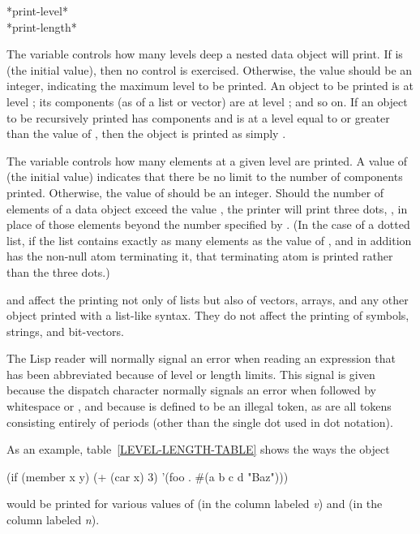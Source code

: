 \begin{defun}[Variable]
*print-level* \\
*print-length*

The  variable controls how many levels deep a nested
data object will print.
If  is {\false} (the initial value), then no control is exercised.
Otherwise, the value should be an integer, indicating the maximum level to
be printed.  An object to be printed is at level ;
its components (as of a list or vector) are at level ; and so on.
If an object to be recursively printed has components and is at a level
equal to or greater than the value of , then the object
is printed as simply \cd{\#}.

The  variable controls how many elements at a given level
are printed.  A value of {\false} (the initial value) indicates that there
be no limit to the number of components printed.  Otherwise, the value of
 should be an integer.  Should the number of elements of a
data object exceed the value , the printer will print three
dots, , in place of those elements beyond the number specified
by .  (In the case of a dotted list, if the list contains
exactly as many elements as the value of , and in addition
has the non-null atom terminating it, that terminating atom is printed
rather than the three dots.)

 and  affect the printing not only of lists
but also of vectors, arrays, and any other object printed with
a list-like syntax.  They do not affect the printing of symbols,
strings, and bit-vectors.

The Lisp reader will normally signal an error when reading
an expression that has been abbreviated because of level or length limits.
This signal is given because the \cd{\#} dispatch character normally signals
an error when followed by whitespace or \cd{)}, and because 
is defined to be an illegal token, as are all tokens consisting
entirely of periods (other than the single dot used in dot notation).

As an example, table~\ref{LEVEL-LENGTH-TABLE} shows the ways the object
\begin{lisp}
(if (member x y) (+ (car x) 3) '(foo . \#(a b c d "Baz")))
\end{lisp}
would be printed for various values of 
(in the column labeled {\it v}) and  (in the column labeled {\it n}).
\end{defun}

